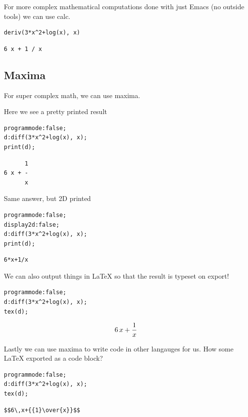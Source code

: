 \documentclass[11pt]{article}
\begin{document}
For more complex mathematical computations done with just Emacs (no outside tools) we can use calc.

\begin{verbatim}
deriv(3*x^2+log(x), x)
\end{verbatim}

\begin{verbatim}
6 x + 1 / x
\end{verbatim}

\subsection{Maxima}
\label{sec:org9b9033a}

For super complex math, we can use maxima.  

Here we see a  pretty printed result

\begin{verbatim}
programmode:false;
d:diff(3*x^2+log(x), x);
print(d);
\end{verbatim}

\begin{verbatim}
      1
6 x + - 
      x
\end{verbatim}

Same answer, but 2D printed

\begin{verbatim}
programmode:false;
display2d:false;
d:diff(3*x^2+log(x), x);
print(d);
\end{verbatim}

\begin{verbatim}
6*x+1/x 
\end{verbatim}

We can also output things in \LaTeX{} so that the result is typeset on export!

\begin{verbatim}
programmode:false;
d:diff(3*x^2+log(x), x);
tex(d);
\end{verbatim}

$$6\,x+{{1}\over{x}}$$

Lastly we can use maxima to write code in other langauges for us.  How some \LaTeX{} exported as a code block?

\begin{verbatim}
programmode:false;
d:diff(3*x^2+log(x), x);
tex(d);
\end{verbatim}

\begin{verbatim}
$$6\,x+{{1}\over{x}}$$
\end{verbatim}
\end{document}
